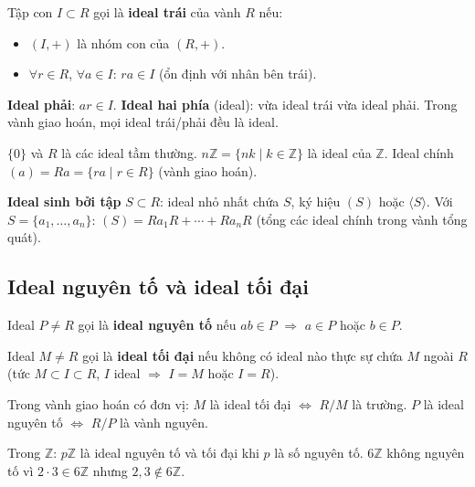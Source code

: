 \documentclass[12pt,a4paper]{article}
\begin{document}
\begin{dinhnghia}
  Tập con $I \subset R$ gọi là \textbf{ideal trái} của vành $R$ nếu:
  \begin{itemize}
    \item $(I, +)$ là nhóm con của $(R, +)$.
    \item $\forall r \in R$, $\forall a \in I$: $ra \in I$ (ổn định với nhân bên trái).
  \end{itemize}
  \textbf{Ideal phải}: $ar \in I$. \textbf{Ideal hai phía} (ideal): vừa ideal trái vừa ideal phải. Trong vành giao hoán, mọi ideal trái/phải đều là ideal.
\end{dinhnghia}

\begin{vidu}
  $\{0\}$ và $R$ là các ideal tầm thường. $n\mathbb{Z} = \{nk \mid k \in \mathbb{Z}\}$ là ideal của $\mathbb{Z}$. Ideal chính $(a) = Ra = \{ra \mid r \in R\}$ (vành giao hoán).
\end{vidu}

\begin{dinhnghia}
  \textbf{Ideal sinh bởi tập} $S \subset R$: ideal nhỏ nhất chứa $S$, ký hiệu $(S)$ hoặc $\langle S \rangle$. Với $S = \{a_1, \ldots, a_n\}$: $(S) = Ra_1 R + \cdots + Ra_n R$ (tổng các ideal chính trong vành tổng quát).
\end{dinhnghia}

\subsection{Ideal nguyên tố và ideal tối đại}

\begin{dinhnghia}
  Ideal $P \ne R$ gọi là \textbf{ideal nguyên tố} nếu $ab \in P$ $\Rightarrow$ $a \in P$ hoặc $b \in P$.
\end{dinhnghia}

\begin{dinhnghia}
  Ideal $M \ne R$ gọi là \textbf{ideal tối đại} nếu không có ideal nào thực sự chứa $M$ ngoài $R$ (tức $M \subset I \subset R$, $I$ ideal $\Rightarrow$ $I = M$ hoặc $I = R$).
\end{dinhnghia}

\begin{dinhly}
  Trong vành giao hoán có đơn vị: $M$ là ideal tối đại $\Leftrightarrow$ $R/M$ là trường. $P$ là ideal nguyên tố $\Leftrightarrow$ $R/P$ là vành nguyên.
\end{dinhly}

\begin{vidu}
  Trong $\mathbb{Z}$: $p\mathbb{Z}$ là ideal nguyên tố và tối đại khi $p$ là số nguyên tố. $6\mathbb{Z}$ không nguyên tố vì $2 \cdot 3 \in 6\mathbb{Z}$ nhưng $2, 3 \notin 6\mathbb{Z}$.
\end{vidu}
\end{document}
